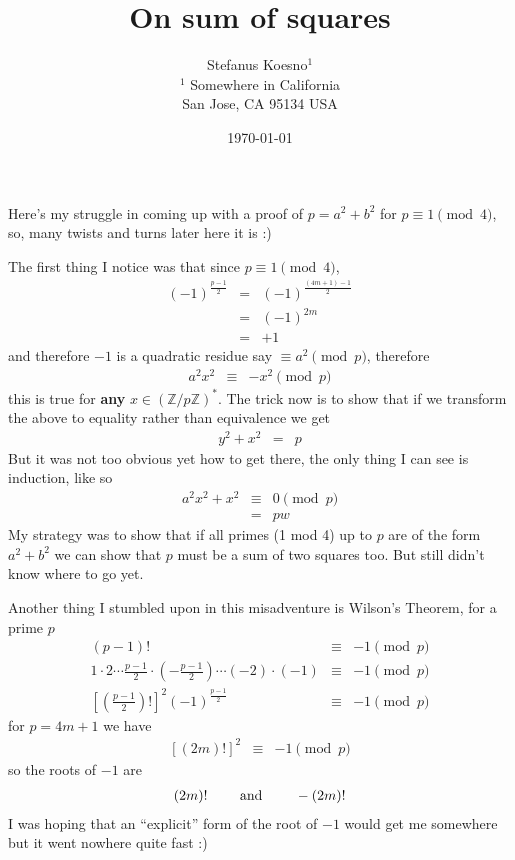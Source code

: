 \documentclass[aps,preprint,preprintnumbers,nofootinbib,showpacs,prd]{revtex4-1}
\newcommand{\nbea}{\begin{eqnarray*}}
\newcommand{\neea}{\end{eqnarray*}}
\begin{document}
\title{On sum of squares}
\bigskip
\author{Stefanus Koesno$^1$\\
$^1$ Somewhere in California\\ San Jose, CA 95134 USA\\
}
%
\date{\today}
%
\begin{abstract}

\end{abstract}
%
\maketitle

\renewcommand{\theequation}{A.\arabic{equation}}  %
\setcounter{equation}{0}  %


Here's my struggle in coming up with a proof of $p = a^2 + b^2$ for $p \equiv 1 \pmod{4}$, so, many twists and turns later here it is :)

The first thing I notice was that since $p \equiv 1 \pmod{4}$,
%
\nbea
(-1)^{\frac{p-1}{2}} & = & (-1)^{\frac{(4m+1)-1}{2}} \\
& = & (-1)^{2m} \\
& = & +1
\neea
%
and therefore $-1$ is a quadratic residue say $\equiv a^2 \pmod{p}$, therefore
%
\nbea
a^2 x^2 & \equiv & -x^2 \pmod{p}
\neea
%
this is true for {\bf any} $x \in (\mathbb{Z}/p\mathbb{Z})^*$. The trick now is to show that if we transform the above to equality rather than equivalence we get 
%
\nbea
y^2 + x^2 & = & p
\neea
%
But it was not too obvious yet how to get there, the only thing I can see is induction, like so
%
\nbea
a^2x^2 + x^2 & \equiv & 0 \pmod{p} \\
& = & pw
\neea
%
My strategy was to show that if all primes (1 mod 4) up to $p$ are of the form $a^2 + b^2$ we can show that $p$ must be a sum of two squares too. But still didn't know where to go yet.

Another thing I stumbled upon in this misadventure is Wilson's Theorem, for a prime $p$
%
\nbea
(p-1)! & \equiv & -1 \pmod{p} \\
1\cdot2\cdots \frac{p-1}{2} \cdot \left(-\frac{p-1}{2}\right) \cdots (-2)\cdot (-1) & \equiv & -1 \pmod{p} \\
\left \lbrack\left ( \frac{p-1}{2} \right ) ! \right \rbrack^2 (-1)^{\frac{p-1}{2}} & \equiv & -1 \pmod{p}
\neea
%
for $p = 4m+1$ we have
%
\nbea
\left \lbrack\left ( 2m \right ) ! \right \rbrack^2 & \equiv & -1 \pmod{p}
\neea
%
so the roots of $-1$ are
%
\nbea
\left ( 2m \right ) ! ~~~~~~~{\rm and} ~~~~~~~ -\left ( 2m \right ) !
\neea
%
I was hoping that an ``explicit'' form of the root of $-1$ would get me somewhere but it went nowhere quite fast :)
\end{document}
